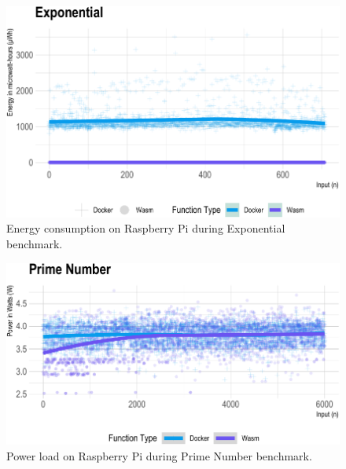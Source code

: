 \documentclass[
  table]{report}
\begin{document}
\begin{figure}[H]

{\centering \includegraphics{thesis_files/figure-latex/exp-energy-1} 

}

\caption{Energy consumption on Raspberry Pi during Exponential benchmark.}\label{fig:exp-energy}
\end{figure}

\newpage

\begin{figure}[H]

{\centering \includegraphics{thesis_files/figure-latex/prime-power-1} 

}

\caption{Power load on Raspberry Pi during Prime Number benchmark.}\label{fig:prime-power}
\end{figure}
\end{document}
